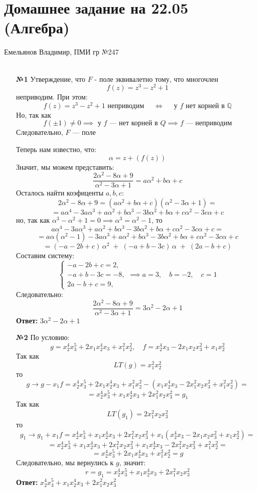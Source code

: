 \documentclass[a4paper]{article}
\renewcommand{\f}[2]{\frac{#1}{#2}}
\newcommand{\lr}{\Leftrightarrow}
\newcommand{\QQ}{\mathbb{Q}}
\begin{document}
\section*{Домашнее задание на 22.05 (Алгебра)}
{\large Емельянов Владимир, ПМИ гр №247}\\\\
\begin{enumerate}
  \item[\textbf{№1}]Утверждение, что $F$ - поле эквивалетно тому, что многочлен
  $$f(z) = z^3 -z^2 + 1$$
  неприводим. При этом:
  $$f(z) = z^3 -z^2 + 1\text{ неприводим } \quad \lr \quad \text{ у $f$ нет корней в $\QQ$}$$
  Но, так как $$f(\pm 1) \neq 0 \implies \text{ у $f$ --- нет корней в $Q$} \implies f \text{ --- неприводим}$$
  Следовательно, $F$ --- поле

  Теперь нам известно, что:
  $$\alpha = z + (f(z))$$
  Значит, мы можем представить:
  $$\f{2\alpha^2 - 8\alpha + 9}{\alpha^2 -3\alpha + 1} = a\alpha^2 + b\alpha + c$$
  Осталось найти коэфиценты $a, b, c$:
  $$2\alpha^2 - 8\alpha + 9= (a\alpha^2 + b\alpha + c)(\alpha^2 -3\alpha + 1)=$$
  $$
  = a\alpha^4 -3a\alpha^3 + a\alpha^2
  + b\alpha^3 -3b\alpha^2 + b\alpha
  + c\alpha^2 -3c\alpha + c
  $$
  но, так как $\alpha^3 -\alpha^2 + 1 = 0 \implies \alpha^3 = \alpha^2 - 1$, то
  $$a\alpha^4 -3a\alpha^3 + a\alpha^2
  + b\alpha^3 -3b\alpha^2 + b\alpha
  + c\alpha^2 -3c\alpha + c =$$
  $$=a\alpha(\alpha^2 - 1) -3a\alpha^3 + a\alpha^2
  + b\alpha^3 -3b\alpha^2 + b\alpha
  + c\alpha^2 -3c\alpha + c $$
  $$= (-a-2b+c)\,\alpha^2\;+\;(-a+b-3c)\,\alpha\;+\;(2a - b + c)$$
  Составим систему:
  $$
  \begin{cases}
  -a-2b+c=2,\\
  -a+b-3c=-8,\\
  2a - b + c=9,
  \end{cases}
  \implies a=3,\quad b=-2,\quad c=1$$
  Следовательно:
  $$\f{2\alpha^2 - 8\alpha + 9}{\alpha^2 -3\alpha + 1} = 3\alpha^2 -2\alpha + 1$$
  \textbf{Ответ: } $3\alpha^2 -2\alpha + 1$

  \item[\textbf{№2}]
  По условию:
  $$g = x_2^4x_3^5 + 2x_1x_2^4x_3 + x_1^2x_2^2, \quad f = x_2^4x_3 - 2x_1x_2x_3^2 + x_1x_2^2$$
  Так как
  $$LT(g) = x_1^2 x_2^2$$
  то 
  $$g \to g-x_1f = x_2^4x_3^5 + 2x_1x_2^4x_3 + x_1^2x_2^2 - (x_1x_2^4x_3 - 2x_1^2x_2x_3^2 + x_1^2x_2^2) = $$
  $$=x_2^4x_3^5 + x_1x_2^4x_3 + 2x_1^2x_2x_3^2 = g_1 $$
  Так как 
  $$LT(g_1) = 2x_1^2x_2x_3^2$$
  то
  $$g_1 \to g_1 + x_1f = x_2^4x_3^5 + x_1x_2^4x_3 + 2x_1^2x_2x_3^2  + x_1(x_2^4x_3 - 2x_1x_2x_3^2 + x_1x_2^2) = $$
  $$=x_2^4x_3^5 + x_1x_2^4x_3 + 2x_1^2x_2x_3^2  + x_1x_2^4x_3 - 2x_1^2x_2x_3^2 + x_1^2x_2^2 = $$
  $$ = x_2^4x_3^5 + 2x_1x_2^4x_3 + x_1^2x_2^2 = g$$
  Следовательно, мы вернулись к $g$, значит:
  $$r = g_1 = x_2^4x_3^5 + x_1x_2^4x_3 + 2x_1^2x_2x_3^2$$
  \textbf{Ответ: } $x_2^4x_3^5 + x_1x_2^4x_3 + 2x_1^2x_2x_3^2$

\end{enumerate}
\end{document}
